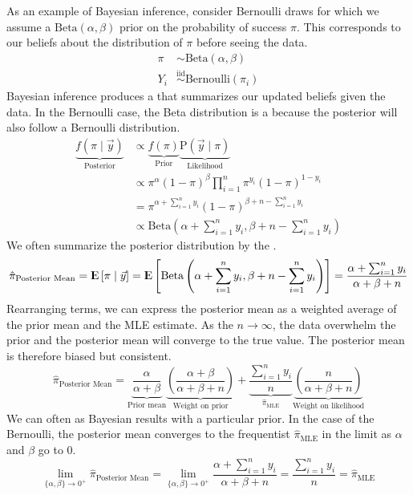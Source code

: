 \documentclass[11pt]{article}
\newcommand{\E}{{\rm I\kern-.3em E}}
\renewcommand{\P}{\text{P}}
\newcommand{\bgreen}[1]{\textbf{\color{olive}{#1}}}
\begin{document}
As an example of Bayesian inference, consider Bernoulli draws for which we assume a $\text{Beta}(\alpha,\beta)$ prior on the probability of success $\pi$. This corresponds to our beliefs about the distribution of $\pi$ before seeing the data.
$$\begin{aligned}
\pi &\sim \text{Beta}(\alpha,\beta) \\
Y_i &\stackrel{\text{iid}}{\sim} \text{Bernoulli}(\pi_i)
\end{aligned}$$
Bayesian inference produces a \bgreen{posterior distribution} that summarizes our updated beliefs given the data. In the Bernoulli case, the Beta distribution is a \bgreen{conjugate prior} because the posterior will also follow a Bernoulli distribution.
$$\begin{aligned}
\underbrace{f(\pi\mid \vec{y})}_\text{Posterior} &\propto \underbrace{f(\pi)}_\text{Prior} \underbrace{\P(\vec{y}\mid \pi)}_\text{Likelihood} \\
&\propto \pi^\alpha(1-\pi)^\beta \prod_{i=1}^n \pi^{y_i}(1-\pi)^{1-y_i} \\
&= \pi^{\alpha + \sum_{i=1}^n y_i}(1-\pi)^{\beta + n - \sum_{i=1}^n y_i} \\
&\propto \text{Beta}\left(\alpha + \sum_{i=1}^n y_i,\beta + n - \sum_{i=1}^n y_i\right)
\end{aligned}$$
We often summarize the posterior distribution by the \bgreen{posterior mean}.
$$\hat\pi_\text{Posterior Mean} = \E\left[\pi\mid \vec{y}\right] = \E\left[\text{Beta}\left(\alpha + \sum_{i=1}^n y_i,\beta + n - \sum_{i=1}^n y_i\right)\right] = \frac{\alpha + \sum_{i=1}^n y_i}{\alpha + \beta + n}$$
Rearranging terms, we can express the posterior mean as a weighted average of the prior mean and the MLE estimate. As the $n\rightarrow\infty$, the data overwhelm the prior and the posterior mean will converge to the true value. The posterior mean is therefore biased but consistent.
$$\hat\pi_\text{Posterior Mean} = \underbrace{\frac{\alpha}{\alpha + \beta}}_\text{Prior mean}\underbrace{\left(\frac{\alpha + \beta}{\alpha + \beta + n}\right)}_\text{Weight on prior} + \underbrace{\frac{\sum_{i=1}^n y_i}{n}}_{\hat\pi_\text{MLE}}\underbrace{\left(\frac{n}{\alpha + \beta + n}\right)}_\text{Weight on likelihood}$$
We can often \bgreen{re-interpret frequentist results} as Bayesian results with a particular prior. In the case of the Bernoulli, the posterior mean converges to the frequentist $\hat\pi_\text{MLE}$ in the limit as $\alpha$ and $\beta$ go to 0.
$$\lim_{\{\alpha,\beta\}\rightarrow 0^+} \hat\pi_\text{Posterior Mean} = \lim_{\{\alpha,\beta\}\rightarrow 0^+} \frac{\alpha + \sum_{i=1}^n y_i}{\alpha + \beta + n} = \frac{\sum_{i=1}^n y_i}{n}  = \hat\pi_\text{MLE}$$
\end{document}
